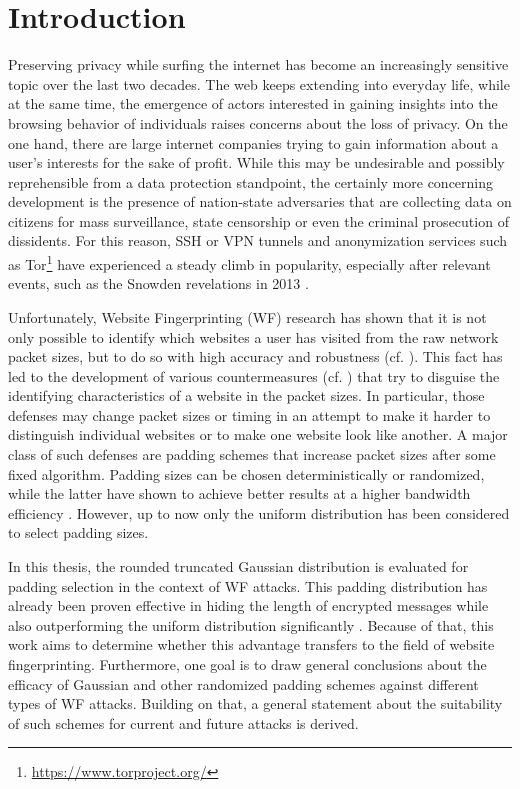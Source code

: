 \documentclass[
	ruledheaders=chapter,
	class=report,
	thesis={type=master, department=inf},
	accentcolor=1c,
	custommargins=true,
	marginpar=false,
	parskip=half-,
	fontsize=11pt,
]{tudapub}
\begin{document}
	\tableofcontents
	
	\chapter{Introduction}
	\label{introduction}

	Preserving privacy while surfing the internet has become an increasingly sensitive topic over the last two decades. The web keeps extending into everyday life, while at the same time, the emergence of actors interested in gaining insights into the browsing behavior of individuals raises concerns about the loss of privacy. On the one hand, there are large internet companies trying to gain information about a user's interests for the sake of profit. While this may be undesirable and possibly reprehensible from a data protection standpoint, the certainly more concerning development is the presence of nation-state adversaries that are collecting data on citizens for mass surveillance, state censorship or even the criminal prosecution of dissidents. For this reason, SSH or VPN tunnels and anonymization services such as Tor\footnote{\url{https://www.torproject.org/}} have experienced a steady climb in popularity, especially after relevant events, such as the Snowden revelations in 2013 \cite{TorHistory}.
	
	Unfortunately, Website Fingerprinting (WF) research has shown that it is not only possible to identify which websites a user has visited from the raw network packet sizes, but to do so with high accuracy and robustness (cf. \cite{Liberatore2006,Herrmann2009,Panchenko2011,Dyer2012,Wang2014,Panchenko2016,Hayes2016,Sirinam2018,Wang2021}). This fact has led to the development of various countermeasures (cf. \cite{Wright2009,Dyer2012,Cai2014,Cai2014a,Juarez2016,Luo2021}) that try to disguise the identifying characteristics of a website in the packet sizes. In particular, those defenses may change packet sizes or timing in an attempt to make it harder to distinguish individual websites or to make one website look like another. A major class of such defenses are padding schemes that increase packet sizes after some fixed algorithm. Padding sizes can be chosen deterministically or randomized, while the latter have shown to achieve better results at a higher bandwidth efficiency \cite{Dyer2012}. However, up to now only the uniform distribution has been considered to select padding sizes.
	
	In this thesis, the rounded truncated Gaussian distribution is evaluated for padding selection in the context of WF attacks. This padding distribution has already been proven effective in hiding the length of encrypted messages while also outperforming the uniform distribution significantly \cite{Degabriele2021}. Because of that, this work aims to determine whether this advantage transfers to the field of website fingerprinting. Furthermore, one goal is to draw general conclusions about the efficacy of Gaussian and other randomized padding schemes against different types of WF attacks. Building on that, a general statement about the suitability of such schemes for current and future attacks is derived.
	
\end{document}
